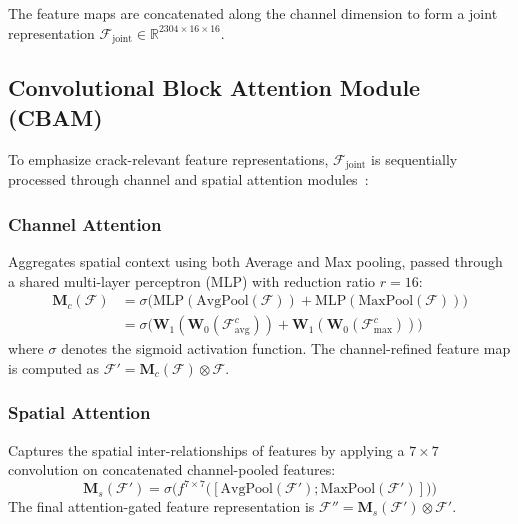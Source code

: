 \documentclass[journal]{IEEEtran}
\begin{document}
The feature maps are concatenated along the channel dimension to form a joint representation $\mathcal{F}_{\text{joint}} \in \mathbb{R}^{2304 \times 16 \times 16}$.

\subsection{Convolutional Block Attention Module (CBAM)}
To emphasize crack-relevant feature representations, $\mathcal{F}_{\text{joint}}$ is sequentially processed through channel and spatial attention modules~\cite{woo2018cbam}:

\subsubsection{Channel Attention}
Aggregates spatial context using both Average and Max pooling, passed through a shared multi-layer perceptron (MLP) with reduction ratio $r=16$:
\begin{align}
    \mathbf{M}_c(\mathcal{F}) &= \sigma\Big(\text{MLP}(\text{AvgPool}(\mathcal{F})) + \text{MLP}(\text{MaxPool}(\mathcal{F}))\Big) \nonumber \\
    &= \sigma\Big(\mathbf{W}_1(\mathbf{W}_0(\mathcal{F}_{\text{avg}}^c)) + \mathbf{W}_1(\mathbf{W}_0(\mathcal{F}_{\text{max}}^c))\Big)
\end{align}
where $\sigma$ denotes the sigmoid activation function. The channel-refined feature map is computed as $\mathcal{F}' = \mathbf{M}_c(\mathcal{F}) \otimes \mathcal{F}$.

\subsubsection{Spatial Attention}
Captures the spatial inter-relationships of features by applying a $7 \times 7$ convolution on concatenated channel-pooled features:
\begin{equation}
    \mathbf{M}_s(\mathcal{F}') = \sigma\Big(f^{7 \times 7}\big([\text{AvgPool}(\mathcal{F}'); \text{MaxPool}(\mathcal{F}')]\big)\Big)
\end{equation}
The final attention-gated feature representation is $\mathcal{F}'' = \mathbf{M}_s(\mathcal{F}') \otimes \mathcal{F}'$.
\end{document}
